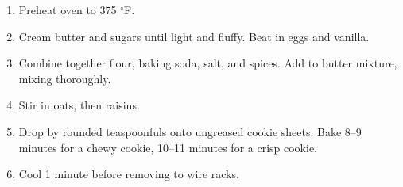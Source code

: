 
\begin{ingredients}
\end{ingredients}


\begin{recipe}
  \begin{enumerate}
  \item Preheat oven to 375 $^\circ$F.

  \item Cream butter and sugars until light and fluffy.  Beat in eggs and vanilla.

  \item Combine together flour, baking soda, salt, and spices.  Add
    to butter mixture, mixing thoroughly.
    
  \item Stir in oats, then raisins.

  \item Drop by rounded teaspoonfuls onto ungreased cookie sheets.
    Bake 8--9 minutes for a chewy cookie, 10--11 minutes for a crisp
    cookie.

  \item Cool 1 minute before removing to wire racks.

  \end{enumerate}
\end{recipe}
